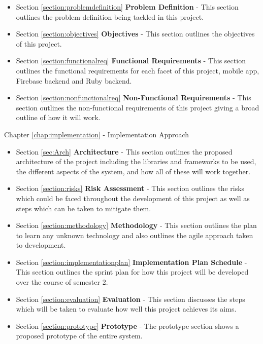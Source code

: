 \begin{itemize}
    \item Section \ref{section:problemdefinition} \textbf{Problem Definition} - This section outlines the problem definition being tackled in this project.
    
    \item Section \ref{section:objectives} \textbf{Objectives} - This section outlines the objectives of this project.
    
    \item Section \ref{section:functionalreq} \textbf{Functional Requirements} - This section outlines the functional requirements for each facet of this project, mobile app, Firebase backend and Ruby backend.
    
    \item Section \ref{section:nonfunctionalreq} \textbf{Non-Functional Requirements} - This section outlines the non-functional requirements of this project giving a broad outline of how it will work.
\end{itemize}

Chapter \ref{chap:implementation} - Implementation Approach

\begin{itemize}
    \item Section \ref{sec:Arch} \textbf{Architecture} - This section outlines the proposed architecture of the project including the libraries and frameworks to be used, the different aspects of the system, and how all of these will work together.
    
    \item Section \ref{section:risks} \textbf{Risk Assessment} - This section outlines the risks which could be faced throughout the development of this project as well as steps which can be taken to mitigate them.
    
    \item Section \ref{section:methodology} \textbf{Methodology} - This section outlines the plan to learn any unknown technology and also outlines the agile approach taken to development.
    
    \item Section \ref{section:implementationplan} \textbf{Implementation Plan Schedule} - This section outlines the sprint plan for how this project will be developed over the course of semester 2.
    
    \item Section \ref{section:evaluation} \textbf{Evaluation} - This section discusses the steps which will be taken to evaluate how well this project achieves its aims.
    
    \item Section \ref{section:prototype} \textbf{Prototype} - The prototype section shows a proposed prototype of the entire system.
\end{itemize}

